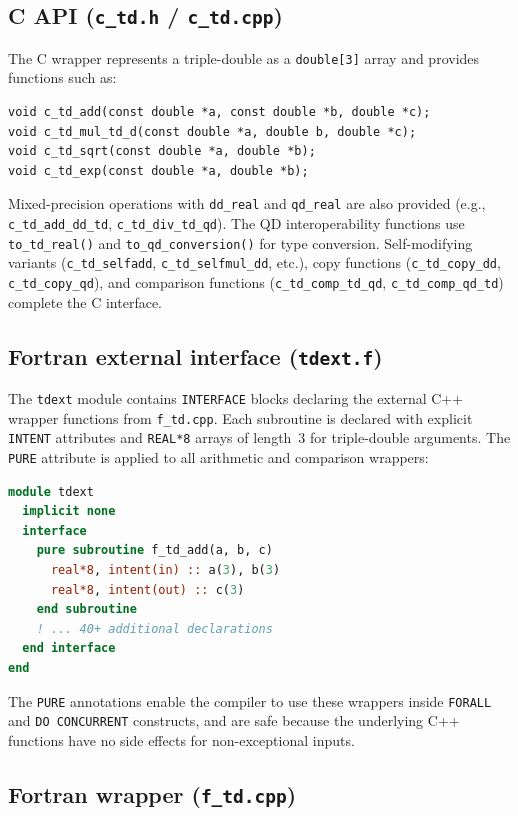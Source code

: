 \documentclass[11pt,a4paper]{article}
\begin{document}
\subsection{C API (\texttt{c\_td.h} / \texttt{c\_td.cpp})}

The C wrapper represents a triple-double as a \texttt{double[3]}
array and provides functions such as:
\begin{lstlisting}
void c_td_add(const double *a, const double *b, double *c);
void c_td_mul_td_d(const double *a, double b, double *c);
void c_td_sqrt(const double *a, double *b);
void c_td_exp(const double *a, double *b);
\end{lstlisting}
Mixed-precision operations with \texttt{dd\_real} and
\texttt{qd\_real} are also provided (e.g.,
\texttt{c\_td\_add\_dd\_td}, \texttt{c\_td\_div\_td\_qd}).  The QD
interoperability functions use \texttt{to\_td\_real()} and
\texttt{to\_qd\_conversion()} for type conversion.
Self-modifying variants (\texttt{c\_td\_selfadd},
\texttt{c\_td\_selfmul\_dd}, etc.), copy functions
(\texttt{c\_td\_copy\_dd}, \texttt{c\_td\_copy\_qd}), and
comparison functions (\texttt{c\_td\_comp\_td\_qd},
\texttt{c\_td\_comp\_qd\_td}) complete the C interface.

\subsection{Fortran external interface (\texttt{tdext.f})}

The \texttt{tdext} module contains \texttt{INTERFACE} blocks
declaring the external C++ wrapper functions from
\texttt{f\_td.cpp}.  Each subroutine is declared with explicit
\texttt{INTENT} attributes and \texttt{REAL*8} arrays of length~3
for triple-double arguments.  The \texttt{PURE} attribute is
applied to all arithmetic and comparison wrappers:
\begin{lstlisting}[language=Fortran]
module tdext
  implicit none
  interface
    pure subroutine f_td_add(a, b, c)
      real*8, intent(in) :: a(3), b(3)
      real*8, intent(out) :: c(3)
    end subroutine
    ! ... 40+ additional declarations
  end interface
end
\end{lstlisting}
The \texttt{PURE} annotations enable the compiler to use these
wrappers inside \texttt{FORALL} and \texttt{DO CONCURRENT}
constructs, and are safe because the underlying C++ functions have
no side effects for non-exceptional inputs.

\subsection{Fortran wrapper (\texttt{f\_td.cpp})}
\end{document}
